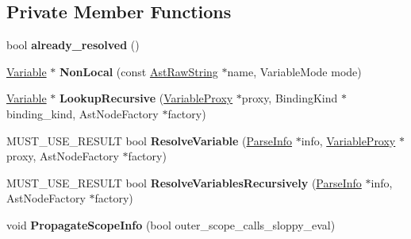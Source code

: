\subsection*{Private Member Functions}
\begin{DoxyCompactItemize}
\item 
bool {\bfseries already\+\_\+resolved} ()\hypertarget{classv8_1_1internal_1_1_scope_ada85f14d546573a3bc19cd9e178919f3}{}\label{classv8_1_1internal_1_1_scope_ada85f14d546573a3bc19cd9e178919f3}

\item 
\hyperlink{classv8_1_1internal_1_1_variable}{Variable} $\ast$ {\bfseries Non\+Local} (const \hyperlink{classv8_1_1internal_1_1_ast_raw_string}{Ast\+Raw\+String} $\ast$name, Variable\+Mode mode)\hypertarget{classv8_1_1internal_1_1_scope_a9eba98dc3a09d007affff9871534ae04}{}\label{classv8_1_1internal_1_1_scope_a9eba98dc3a09d007affff9871534ae04}

\item 
\hyperlink{classv8_1_1internal_1_1_variable}{Variable} $\ast$ {\bfseries Lookup\+Recursive} (\hyperlink{classv8_1_1internal_1_1_variable_proxy}{Variable\+Proxy} $\ast$proxy, Binding\+Kind $\ast$binding\+\_\+kind, Ast\+Node\+Factory $\ast$factory)\hypertarget{classv8_1_1internal_1_1_scope_a2768d51b6afd5b5b63aa16ab193a9178}{}\label{classv8_1_1internal_1_1_scope_a2768d51b6afd5b5b63aa16ab193a9178}

\item 
M\+U\+S\+T\+\_\+\+U\+S\+E\+\_\+\+R\+E\+S\+U\+LT bool {\bfseries Resolve\+Variable} (\hyperlink{classv8_1_1internal_1_1_parse_info}{Parse\+Info} $\ast$info, \hyperlink{classv8_1_1internal_1_1_variable_proxy}{Variable\+Proxy} $\ast$proxy, Ast\+Node\+Factory $\ast$factory)\hypertarget{classv8_1_1internal_1_1_scope_a606fbb16c919acaae8b03bd36e159de0}{}\label{classv8_1_1internal_1_1_scope_a606fbb16c919acaae8b03bd36e159de0}

\item 
M\+U\+S\+T\+\_\+\+U\+S\+E\+\_\+\+R\+E\+S\+U\+LT bool {\bfseries Resolve\+Variables\+Recursively} (\hyperlink{classv8_1_1internal_1_1_parse_info}{Parse\+Info} $\ast$info, Ast\+Node\+Factory $\ast$factory)\hypertarget{classv8_1_1internal_1_1_scope_ae7f3162e292c23b14e0955b0815e6423}{}\label{classv8_1_1internal_1_1_scope_ae7f3162e292c23b14e0955b0815e6423}

\item 
void {\bfseries Propagate\+Scope\+Info} (bool outer\+\_\+scope\+\_\+calls\+\_\+sloppy\+\_\+eval)\hypertarget{classv8_1_1internal_1_1_scope_a6390197be39cee93c4e988529a4733a0}{}\label{classv8_1_1internal_1_1_scope_a6390197be39cee93c4e988529a4733a0}


\end{DoxyCompactItemize}
